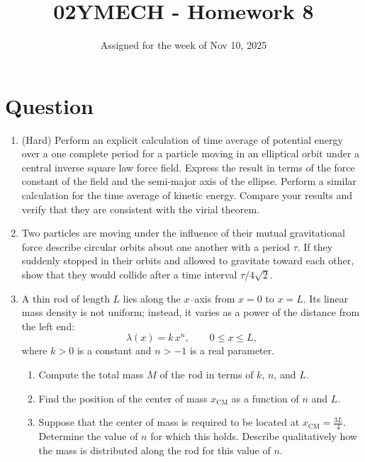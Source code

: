 \documentclass[12pt]{article}
\title{02YMECH - Homework 8}
\date{Assigned for the week of Nov 10, 2025}
\author{}
\begin{document}
\maketitle

\section*{Question}
\begin{enumerate}
    \item (Hard) Perform an explicit calculation of time average of potential energy over a one complete period for a particle moving in an elliptical orbit under a central inverse square law force field. Express the result in terms of the force constant of the field and the semi-major axis of the ellipse. Perform a similar calculation for the time average of kinetic energy. Compare your results and verify that they are consistent with the virial theorem.
    \item Two particles are moving under the influence of their mutual gravitational force describe circular orbits about one another with a period $\tau$. If they suddenly stopped in their orbits and allowed to gravitate toward each other, show that they would collide after a time interval $\tau/4\sqrt{2}$.
    \item A thin rod of length $L$ lies along the $x$–axis from $x = 0$ to $x = L$.  
Its linear mass density is not uniform; instead, it varies as a power of the distance from the left end:
\[
\lambda(x) = k\,x^{n}, \qquad 0 \le x \le L,
\]
where $k>0$ is a constant and $n>-1$ is a real parameter.

\begin{enumerate}
    \item Compute the total mass $M$ of the rod in terms of $k$, $n$, and $L$.
    \item Find the position of the center of mass $x_{\mathrm{CM}}$ as a function of $n$ and $L$.
    \item Suppose that the center of mass is required to be located at $x_{\mathrm{CM}} = \frac{3L}{4}$. Determine the value of $n$ for which this holds. Describe qualitatively how the mass is distributed along the rod for this value of $n$.
\end{enumerate}

\end{enumerate}
\end{document}
